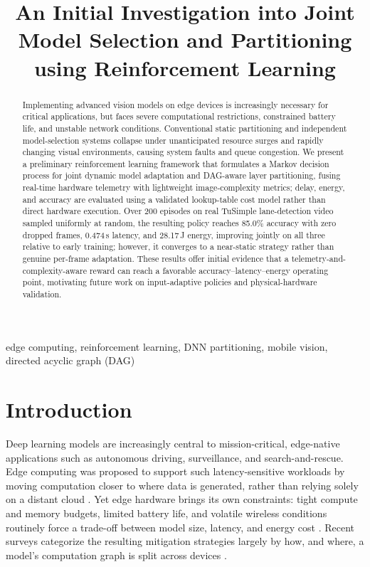 \documentclass[conference]{IEEEtran}
\begin{document}
\title{An Initial Investigation into Joint Model Selection and Partitioning using Reinforcement Learning}


\maketitle


\begin{abstract}
Implementing advanced vision models on edge devices is increasingly necessary for critical applications, but faces severe computational restrictions, constrained battery life, and unstable network conditions. Conventional static partitioning and independent model-selection systems collapse under unanticipated resource surges and rapidly changing visual environments, causing system faults and queue congestion. We present a preliminary reinforcement learning framework that formulates a Markov decision process for joint dynamic model adaptation and DAG-aware layer partitioning, fusing real-time hardware telemetry with lightweight image-complexity metrics; delay, energy, and accuracy are evaluated using a validated lookup-table cost model rather than direct hardware execution. Over 200 episodes on real TuSimple lane-detection video sampled uniformly at random, the resulting policy reaches 85.0\% accuracy with zero dropped frames, 0.474\,s latency, and 28.17\,J energy, improving jointly on all three relative to early training; however, it converges to a near-static strategy rather than genuine per-frame adaptation. These results offer initial evidence that a telemetry-and-complexity-aware reward can reach a favorable accuracy--latency--energy operating point, motivating future work on input-adaptive policies and physical-hardware validation.
\end{abstract}

\begin{IEEEkeywords}
edge computing, reinforcement learning, DNN partitioning, mobile vision, directed acyclic graph (DAG)
\end{IEEEkeywords}

\section{Introduction}
Deep learning models are increasingly central to mission-critical, edge-native applications such as autonomous driving, surveillance, and search-and-rescue. Edge computing was proposed to support such latency-sensitive workloads by moving computation closer to where data is generated, rather than relying solely on a distant cloud \cite{shi2016edge}. Yet edge hardware brings its own constraints: tight compute and memory budgets, limited battery life, and volatile wireless conditions routinely force a trade-off between model size, latency, and energy cost \cite{schwartz2020green}. Recent surveys categorize the resulting mitigation strategies largely by how, and where, a model's computation graph is split across devices \cite{hao2026dnn}.
\end{document}
